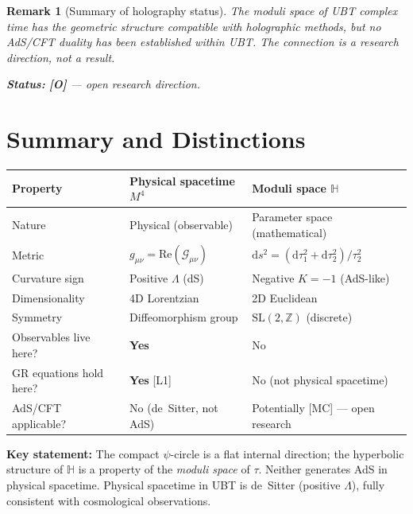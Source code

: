 \documentclass[11pt,a4paper]{article}
\newtheorem{remark}{Remark}
\begin{document}
\begin{remark}[Summary of holography status]
The moduli space of UBT complex time has the geometric structure compatible with
holographic methods, but no AdS/CFT duality has been established within UBT.
The connection is a research direction, not a result.

\noindent\textbf{Status:} \textbf{[O]} — open research direction.
\end{remark}

\section{Summary and Distinctions}
\label{sec:summary}

\begin{center}
\begin{tabular}{|p{4cm}|p{4cm}|p{4cm}|}
\hline
\textbf{Property} & \textbf{Physical spacetime $M^4$} & \textbf{Moduli space $\mathbb{H}$} \\
\hline
Nature & Physical (observable) & Parameter space (mathematical) \\
Metric & $g_{\mu\nu} = \mathrm{Re}(\mathcal{G}_{\mu\nu})$ & $\mathrm{d}s^2 = (\mathrm{d}\tau_1^2 + \mathrm{d}\tau_2^2)/\tau_2^2$ \\
Curvature sign & Positive $\Lambda$ (dS) & Negative $K=-1$ (AdS-like) \\
Dimensionality & 4D Lorentzian & 2D Euclidean \\
Symmetry & Diffeomorphism group & $\mathrm{SL}(2,\mathbb{Z})$ (discrete) \\
Observables live here? & \textbf{Yes} & No \\
GR equations hold here? & \textbf{Yes} [L1] & No (not physical spacetime) \\
AdS/CFT applicable? & No (de~Sitter, not AdS) & Potentially [MC] — open research \\
\hline
\end{tabular}
\end{center}

\bigskip

\noindent\textbf{Key statement:} The compact $\psi$-circle is a flat internal
direction; the hyperbolic structure of $\mathbb{H}$ is a property of the
\emph{moduli space} of $\tau$. Neither generates AdS in physical spacetime.
Physical spacetime in UBT is de~Sitter (positive $\Lambda$), fully consistent
with cosmological observations.
\end{document}
